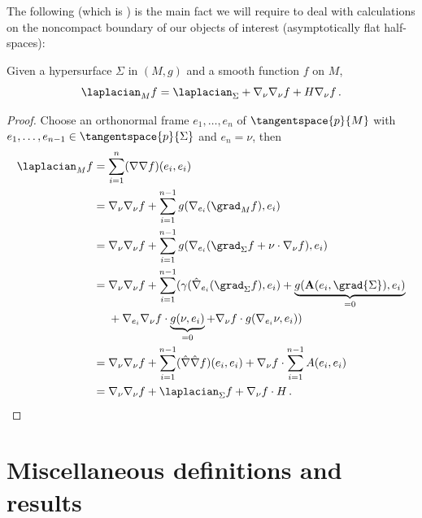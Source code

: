 \documentclass[titlepage,numbers=noenddot,oneside,%
cleardoublepage=empty,paper=a4,fontsize=11pt,%
english,%
]{scrartcl}
\newcommand*{\mathfullstop}{\,.}
\begin{document}
{The following (which is \cite[Exercise 2.3 in][]{leeGeometricRelativity2019}) is the main fact we will require to deal with calculations on the noncompact boundary of our objects of interest (asymptotically flat half-spaces):
\begin{fact}\label{fact:laplacian_and_hypersurface_laplacian}
    Given a hypersurface \( \Sigma \) in \( (M,g) \) and a smooth function \( f \) on \( M \),
    \begin{equation*}
        \laplacian_M f=\laplacian_\Sigma +\Mconnection_\nu\Mconnection_\nu f+H \Mconnection_\nu f\mathfullstop
    \end{equation*}
\end{fact}
\begin{proof}
    Choose an orthonormal frame \( e_1,\dotsc,e_n \) of \( \tangentspace{p}{M} \) with \( e_1,\dotsc,e_{n-1}\in \tangentspace{p}{\Sigma} \) and \( e_n=\nu \), then
    \begin{align*}
        \laplacian_M f&=\sum_{i=1}^{n}(\Mconnection\Mconnection f)(e_i,e_i)\\
        &=\Mconnection_\nu \Mconnection_\nu f+\sum_{i=1}^{n-1}g(\Mconnection_{e_i} (\grad_M f),e_i)\\
        &=\Mconnection_\nu \Mconnection_\nu f+\sum_{i=1}^{n-1}g(\Mconnection_{e_i}(\grad_{\Sigma}f+\nu\cdot \Mconnection_\nu f),e_i)\\
        &=\begin{aligned}[t]
            &\Mconnection_\nu \Mconnection_\nu f+\sum_{i=1}^{n-1}(\gamma(\Sigmaconnection_{e_i}(\grad_{\Sigma} f),e_i)+\underbrace{g(\mathbf{A}(e_i,\grad{\Sigma}),e_i)}_{=0}\\
            &+\Mconnection_{
        e_i}\Mconnection_{\nu}f\cdot \underbrace{g(\nu,e_i)}_{=0}+\Mconnection_{\nu}f\cdot g(\Mconnection_{e_i}\nu,e_i))
        \end{aligned}\\
        &=\Mconnection_\nu \Mconnection_\nu f+\sum_{i=1}^{n-1}(\Sigmaconnection\Sigmaconnection f)(e_i,e_i)+\Mconnection_\nu f\cdot \sum_{i=1}^{n-1}A(e_i,e_i)\\
        &=\Mconnection_\nu \Mconnection_\nu f+\laplacian_{\Sigma}f+\Mconnection_{\nu}f\cdot H\mathfullstop
    \end{align*}
\end{proof}
}
\section{Miscellaneous definitions and results}\label{sec:miscellaneous}
\end{document}
